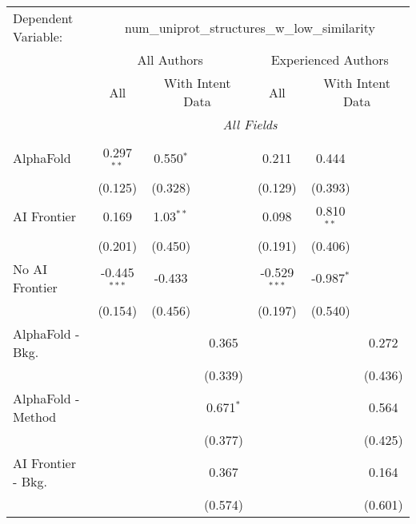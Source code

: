 \begingroup
\centering
\begin{tabular}{lcccccc}
   \tabularnewline \midrule \midrule
   Dependent Variable: & \multicolumn{6}{c}{num\_uniprot\_structures\_w\_low\_similarity}\\
 & \multicolumn{3}{c}{All Authors} & \multicolumn{3}{c}{Experienced Authors} \\
\cmidrule(lr){2-4} \cmidrule(lr){5-7}
 & \multicolumn{1}{c}{All} & \multicolumn{2}{c}{With Intent Data} & \multicolumn{1}{c}{All} & \multicolumn{2}{c}{With Intent Data} \\
\cmidrule(lr){2-2} \cmidrule(lr){3-4} \cmidrule(lr){5-5} \cmidrule(lr){6-7}
 & \multicolumn{6}{c}{\textit{All Fields}} \\ \\
   AlphaFold               & 0.297$^{**}$   & 0.550$^{*}$ &              & 0.211          & 0.444        &   \\   
                           & (0.125)        & (0.328)     &              & (0.129)        & (0.393)      &   \\   
   AI Frontier             & 0.169          & 1.03$^{**}$ &              & 0.098          & 0.810$^{**}$ &   \\   
                           & (0.201)        & (0.450)     &              & (0.191)        & (0.406)      &   \\   
   No AI Frontier          & -0.445$^{***}$ & -0.433      &              & -0.529$^{***}$ & -0.987$^{*}$ &   \\   
                           & (0.154)        & (0.456)     &              & (0.197)        & (0.540)      &   \\   
   AlphaFold - Bkg.        &                &             & 0.365        &                &              & 0.272\\   
                           &                &             & (0.339)      &                &              & (0.436)\\   
   AlphaFold - Method      &                &             & 0.671$^{*}$  &                &              & 0.564\\   
                           &                &             & (0.377)      &                &              & (0.425)\\   
   AI Frontier - Bkg.      &                &             & 0.367        &                &              & 0.164\\   
                           &                &             & (0.574)      &                &              & (0.601)\\   

\end{tabular}
